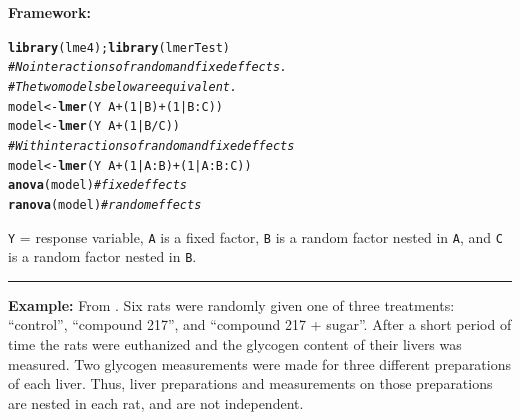 \documentclass[12pt,english]{article}\usepackage[]{graphicx}\usepackage[table]{xcolor}
\makeatletter
\newcommand{\hlnum}[1]{\textcolor[rgb]{0.686,0.059,0.569}{#1}}%
\newcommand{\hlcom}[1]{\textcolor[rgb]{0.678,0.584,0.686}{\textit{#1}}}%
\newcommand{\hlopt}[1]{\textcolor[rgb]{0,0,0}{#1}}%
\newcommand{\hldef}[1]{\textcolor[rgb]{0.345,0.345,0.345}{#1}}%
\newcommand{\hlkwb}[1]{\textcolor[rgb]{0.69,0.353,0.396}{#1}}%
\newcommand{\hlkwd}[1]{\textcolor[rgb]{0.737,0.353,0.396}{\textbf{#1}}}%
\newenvironment{kframe}{%
 \def\at@end@of@kframe{}%
 \ifinner\ifhmode%
  \def\at@end@of@kframe{\end{minipage}}%
  \begin{minipage}{\columnwidth}%
 \fi\fi%
 \def\FrameCommand##1{\hskip\@totalleftmargin \hskip-\fboxsep
 \colorbox{shadecolor}{##1}\hskip-\fboxsep
     \hskip-\linewidth \hskip-\@totalleftmargin \hskip\columnwidth}%
 \MakeFramed {\advance\hsize-\width
   \@totalleftmargin\z@ \linewidth\hsize
   \@setminipage}}%
 {\par\unskip\endMakeFramed%
 \at@end@of@kframe}
\newenvironment{knitrout}{}{} %
\makeatother
\begin{document}
\begin{tcolorbox}[colback=yellow!50!red!25!white,colbacktitle=yellow!50!red,colframe=black!75!white,title=\textbf{R:} NSE - Two Random Nested Factors]
\textbf{Framework:}\\
\vspace{-.2in}
\begin{knitrout}
\color{fgcolor}\begin{kframe}
\begin{alltt}
\hlkwd{library}\hldef{(lme4);} \hlkwd{library}\hldef{(lmerTest)}
\hlcom{# No interactions of random and fixed effects.}
\hlcom{# The two models below are equivalent.}
\hldef{model} \hlkwb{<-} \hlkwd{lmer}\hldef{(Y} \hlopt{~} \hldef{A} \hlopt{+} \hldef{(}\hlnum{1}\hlopt{|}\hldef{B)} \hlopt{+} \hldef{(}\hlnum{1}\hlopt{|}\hldef{B}\hlopt{:}\hldef{C))}
\hldef{model} \hlkwb{<-} \hlkwd{lmer}\hldef{(Y} \hlopt{~} \hldef{A} \hlopt{+} \hldef{(}\hlnum{1}\hlopt{|}\hldef{B}\hlopt{/}\hldef{C))}
\hlcom{# With interactions of random and fixed effects}
\hldef{model} \hlkwb{<-} \hlkwd{lmer}\hldef{(Y} \hlopt{~} \hldef{A} \hlopt{+} \hldef{(}\hlnum{1}\hlopt{|}\hldef{A}\hlopt{:}\hldef{B)} \hlopt{+} \hldef{(}\hlnum{1}\hlopt{|}\hldef{A}\hlopt{:}\hldef{B}\hlopt{:}\hldef{C))}
\hlkwd{anova}\hldef{(model)} \hlcom{# fixed effects}
\hlkwd{ranova}\hldef{(model)} \hlcom{# random effects}
\end{alltt}
\end{kframe}
\end{knitrout}
\texttt{Y} = response variable, \texttt{A} is a fixed factor, \texttt{B} is a random factor nested in \texttt{A}, and \texttt{C} is a random factor nested in \texttt{B}.
\vspace{0.1in}
\par\noindent\rule{.9\textwidth}{0.4pt}

\textbf{Example:} From \citep{sokal2012}.  Six rats were randomly given one of three treatments: ``control'', ``compound 217'', and ``compound 217 + sugar''. After a short period of time the rats were euthanized and the glycogen content of their livers was measured. Two glycogen measurements were made for three different preparations of each liver. Thus, liver preparations and measurements on those preparations are nested in each rat, and are not independent.
\vspace{0.1in}\\


\end{tcolorbox}
\end{document}
